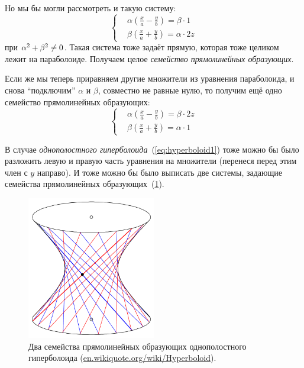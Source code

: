 \documentclass[a4paper,12pt]{article}
\begin{document}
  Но мы бы могли рассмотреть и такую систему:
  \[
    \boxed{
      \left\{
        \begin{aligned}
          &\alpha\left(\frac{x}{a} - \frac{y}{b}\right) = \beta \cdot 1\\
          &\beta\left(\frac{x}{a} + \frac{y}{b}\right) = \alpha \cdot 2z
        \end{aligned}
      \right.
    }
  \]
  при $\alpha^2 \hm+ \beta^2 \hm{\not=} 0$.
  Такая система тоже задаёт прямую, которая тоже целиком лежит на параболоиде.
  Получаем целое \emph{семейство прямолинейных образующих}.
  
  Если же мы теперь приравняем другие множители из уравнения параболоида, и снова ``подключим'' $\alpha$ и $\beta$, совместно не равные нулю, то получим ещё одно семейство прямолинейных образующих:
  \[
    \boxed{
      \left\{
        \begin{aligned}
          &\alpha\left(\frac{x}{a} - \frac{y}{b}\right) = \beta \cdot 2z\\
          &\beta\left(\frac{x}{a} + \frac{y}{b}\right) = \alpha \cdot 1
        \end{aligned}
      \right.
    }
  \]
  
  \medskip
  
  В случае \emph{однополостного гиперболоида}~(\ref{eq:hyperboloid1}) тоже можно бы было разложить левую и правую часть уравнения на множители (перенеся перед этим член с $y$ направо).
  И тоже можно бы было выписать две системы, задающие семейства прямолинейных образующих~(\ref{fig:hyperboloid-rectilinear-generators}).
  
  \begin{figure}[H]
    \centering

    \includegraphics[width=0.5\textwidth]{hyperboloid-rectilinear-generators}
  
    \caption{Два семейства прямолинейных образующих однополостного гиперболоида (\href{https://en.wikiquote.org/wiki/Hyperboloid}{en.wikiquote.org/wiki/Hyperboloid}).}
    \label{fig:hyperboloid-rectilinear-generators}
  \end{figure}
  
\end{document}
